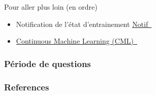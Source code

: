 \documentclass[aspectratio=169,10pt,xcolor=x11names,english,french]{beamer}
\newcommand{\link}[2]{\href{#1}{#2~{\smaller\faExternalLink*}}}
\begin{document}
	\begin{frame}{Pour aller plus loin (en ordre)}
		\begin{itemize}
			\item Notification de l'état d'entrainement \link{https://notificationdoc.ca/}{Notif}
			\item \link{https://cml.dev/}{Continuous Machine Learning (CML)} 
		\end{itemize}
	\end{frame}
	
	\begin{frame}
		\frametitle{Période de questions}
		
		\centering
		\fontsize{100}{100}
		\faQuestion
		
	\end{frame}

	
	
	\begin{frame}[t, allowframebreaks]
		\frametitle{References}
		
		
	\end{frame}
	
	
	
\end{document}
